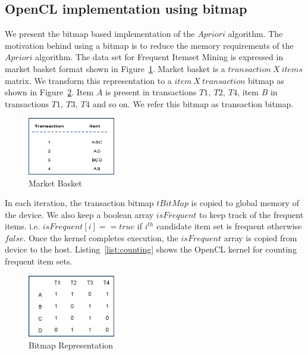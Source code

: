 \documentclass[conference]{IEEEtran}
\begin{document}
\subsection{OpenCL implementation using bitmap}
We present the bitmap based implementation of the $Apriori$ algorithm. The motivation behind using a bitmap is to reduce the memory requirements of the $Apriori$ algorithm. The data set for Frequent Itemset Mining is expressed in market basket format shown in Figure~\ref{fig:marketbasket}. Market basket is a $transaction\ X\ items$ matrix. We transform this representation to a $item\ X\ transaction$ bitmap as shown in Figure~\ref{fig:bitmap}. Item $A$ is present in transactions $T1,\ T2,\ T4$, item $B$ in transactions $T1,\ T3,\ T4$ and so on. We refer this bitmap as transaction bitmap. 
\begin{figure}[!t]
\centering
\includegraphics[width=1.5in]{marketbasket.eps}
\caption{Market Basket}
\label{fig:marketbasket}
\end{figure}

In each iteration, the transaction bitmap $tBitMap$ is copied to global memory of the device. We also keep a boolean array $isFrequent$ to keep track of the frequent items. i.e. $isFrequent[i] == true$ if $i^{th}$ candidate item set is frequent otherwise $false$. Once the kernel completes execution, the $isFrequent$  array is copied from device to the host. Listing~\ref{list:counting} shows the OpenCL kernel for counting frequent item sets.

\begin{figure}[!t]
\centering
\includegraphics[width=1.5in]{bitmap.eps}
\caption{Bitmap Representation}
\label{fig:bitmap}
\end{figure}
\end{document}
